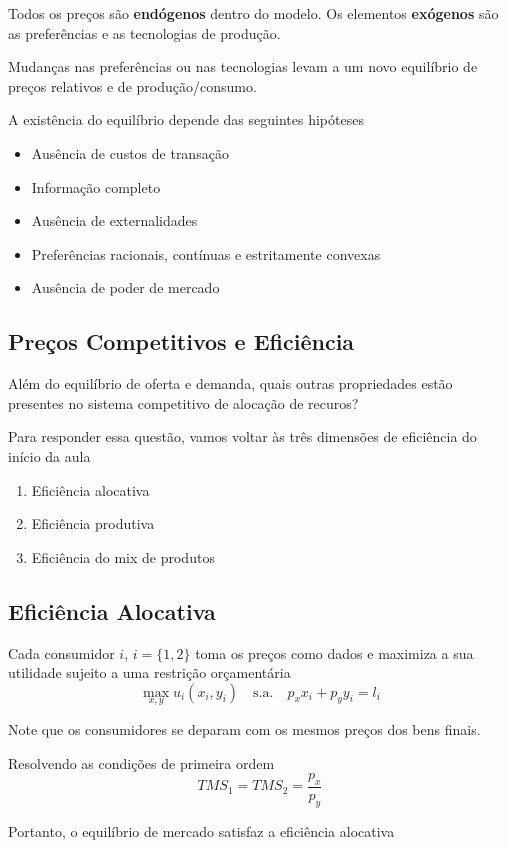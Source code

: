 \documentclass[a4paper,12pt]{article}[abntex2]
\begin{document}
Todos os preços são \textbf{endógenos} dentro do modelo. Os elementos \textbf{exógenos} são as preferências e as tecnologias de produção.

Mudanças nas preferências ou nas tecnologias levam a um novo equilíbrio de preços relativos e de produção/consumo.

A existência do equilíbrio depende das seguintes hipóteses\begin{itemize}
    \item Ausência de custos de transação 
    \item Informação completo 
    \item Ausência de externalidades
    \item Preferências racionais, contínuas e estritamente convexas 
    \item Ausência de poder de mercado
\end{itemize}

\subsection{\textbf{Preços Competitivos e Eficiência}}

Além do equilíbrio de oferta e demanda, quais outras propriedades estão presentes no sistema competitivo de alocação de recuros?

Para responder essa questão, vamos voltar às três dimensões de eficiência do início da aula \begin{enumerate}
    \item Eficiência alocativa
    \item Eficiência produtiva 
    \item Eficiência do mix de produtos
\end{enumerate}

\subsection{\textbf{Eficiência Alocativa}}

Cada consumidor $i$, $i=\{1,2\}$ toma os preços como dados e maximiza a sua utilidade sujeito a uma restrição orçamentária 
\[
\max_{x,y} u_i(x_i, y_i) \quad \text{s.a.} \quad p_x x_i + p_y y_i = l_i
\]

Note que os consumidores se deparam com os mesmos preços dos bens finais.

Resolvendo as condições de primeira ordem
\[
TMS_1=TMS_2=\frac{p_x}{p_y}
\]

Portanto, o equilíbrio de mercado satisfaz a eficiência alocativa
\end{document}
